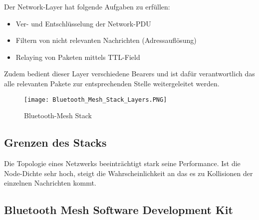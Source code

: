 Der Network-Layer hat folgende Aufgaben zu erfüllen: 

\begin{itemize}
	\item Ver- und Entschlüsselung der Network-PDU
	\item Filtern von nicht relevanten Nachrichten (Adressauflösung)
	\item Relaying von Paketen mittels TTL-Field
\end{itemize}

Zudem bedient dieser Layer verschiedene Bearers und ist dafür verantwortlich das alle relevanten Pakete zur entsprechenden Stelle weitergeleitet werden. \\




\begin{figure} [H]
	\centering
	\texttt{[image: Bluetooth\_Mesh\_Stack\_Layers.PNG]}
	\caption{Bluetooth-Mesh Stack \cite{bluetooth_sig_mesh-technology-overviewpdf_2020}} 
	\label{fig:BTMeshStack}
\end{figure}





\subsection{Grenzen des Stacks}\label{subsec:BLEMeshProtokollStack}

Die Topologie eines Netzwerks beeinträchtigt stark seine Performance. Ist die Node-Dichte sehr hoch, steigt die Wahrscheinlichkeit an das es zu Kollisionen der einzelnen Nachrichten kommt. 

\subsection{Bluetooth Mesh Software Development Kit}\label{sec:ZigbeeSoftwareDevelopmentKit}


